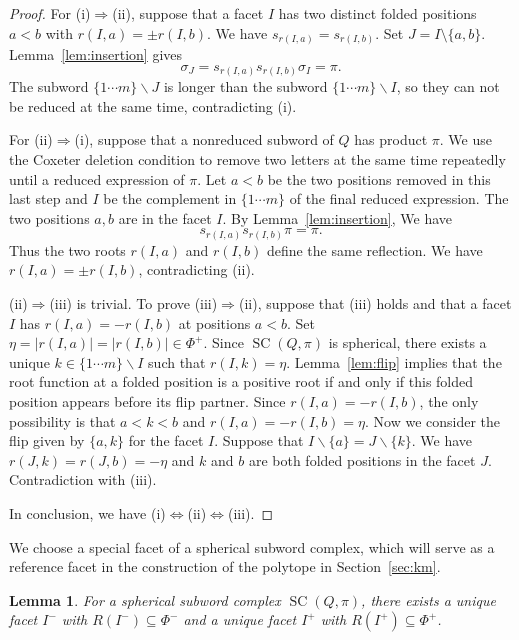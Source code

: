 \documentclass[11pt,a4paper]{article}
\newtheorem{lemma}[theorem]{Lemma}
\theoremstyle{definition}
\theoremstyle{remark}
\newcommand{\SC}{\operatorname{SC}}
\numberwithin{equation}{section}
\begin{document}
\begin{proof}
For (i)$\Rightarrow$(ii), suppose that a facet $I$ has two distinct folded positions $a<b$ with $r(I,a)=\pm r(I,b)$. We have $s_{r(I,a)}=s_{r(I,b)}$. Set $J=I\setminus\{a,b\}$. Lemma~\ref{lem:insertion} gives
\[
 \sigma_J=s_{r(I,a)}s_{r(I,b)}\sigma_I=\pi.
\]
The subword $\{1 \cdots m\}\backslash J$ is longer than the subword $\{1 \cdots m\}\backslash I$, so they can not be reduced at the same time, contradicting (i).

For (ii)$\Rightarrow$(i), suppose that a nonreduced subword of $Q$ has product $\pi$. We use the Coxeter deletion condition to remove two letters at the same time repeatedly until a reduced expression of $\pi$. Let $a<b$ be the two positions removed in this last step and $I$ be the complement in $\{1 \cdots m\}$ of the final reduced expression. The two positions $a,b$ are in the facet $I$. By Lemma~\ref{lem:insertion}, We have
\[
 s_{r(I,a)}s_{r(I,b)}\pi=\pi.
\]
Thus the two roots $r(I,a)$ and $r(I,b)$ define the same reflection. We have $r(I,a)=\pm r(I,b)$, contradicting (ii).

(ii)$\Rightarrow$(iii) is trivial. To prove (iii)$\Rightarrow$(ii), suppose that (iii) holds and that a facet $I$ has $r(I,a)=-r(I,b)$ at positions $a<b$. Set $\eta=|r(I,a)|=|r(I,b)|\in\Phi^+$. Since $\SC(Q,\pi)$ is spherical, there exists a unique $k\in \{1 \cdots m\} \backslash I$ such that $r(I,k)=\eta$. Lemma~\ref{lem:flip} implies that the root function at a folded position is a positive root if and only if this folded position appears before its flip partner. Since $r(I,a)=-r(I,b)$, the only possibility is that $a< k < b$ and $r(I,a)=-r(I,b)=\eta$. Now we consider the flip given by $\{a,k\}$ for the facet $I$. Suppose that $I\backslash \{a\}=J\backslash \{k\}$. We have $r(J,k)=r(J,b)=-\eta$ and $k$ and $b$ are both folded positions in the facet $J$. Contradiction with (iii).

In conclusion, we have (i)$\Leftrightarrow$(ii)$\Leftrightarrow$(iii).

\end{proof}
We choose a special facet of a spherical subword complex, which will serve as a reference facet in the construction of the polytope in Section~\ref{sec:km}.
\begin{lemma}\label{lem:chamber-maps-for-e}
   For a spherical subword complex $\SC(Q,\pi)$, there exists a unique facet $I^-$ with $R(I^-)\subseteq\Phi^-$ and a unique facet $I^+$ with $R(I^+)\subseteq\Phi^+$.
\end{lemma}
\end{document}
